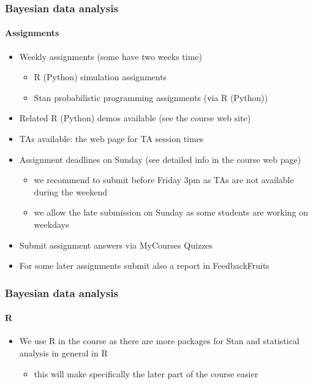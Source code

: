 \documentclass[english,t]{beamer}
\begin{document}
\begin{frame}
  \frametitle{Bayesian data analysis}  %
  \framesubtitle{Assignments}
  \begin{itemize}
  \item Weekly assignments (some have two weeks time)
    \begin{itemize}
    \item R (Python) simulation assignments
    \item Stan probabilistic programming assignments (via R (Python))
    \end{itemize}
  \item Related R (Python) demos available (see the course web site)
  \item TAs available: the web page for TA session times
  \item Assignment deadlines on Sunday (see detailed info in the course web page)
    \begin{itemize}
    \item we recommend to submit before Friday 3pm as TAs are not
      available during the weekend
    \item we allow the late submission on Sunday as some students are
      working on weekdays
    \end{itemize}
  \item Submit assignment answers via MyCourses Quizzes
  \item For some later assignments submit also a report in FeedbackFruits
  \end{itemize}
  
\end{frame}

\begin{frame}
  \frametitle{Bayesian data analysis}  %
  \framesubtitle{R}

  \begin{itemize}
  \item We use R in the course as there are more packages for Stan and
    statistical analysis in general in R
    \begin{itemize}
    \item this will make specifically the later part of the course easier
    \end{itemize}
  \end{itemize}
  
\end{frame}
\end{document}
